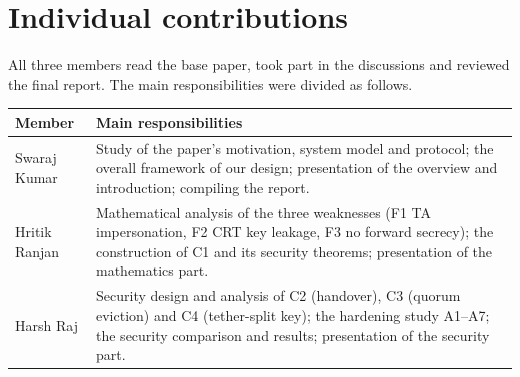 \chapter{Individual contributions}\label{ch:team}
All three members read the base paper, took part in the discussions and reviewed the final report. The main responsibilities were divided as follows.
\begin{center}
\begin{tabularx}{\linewidth}{@{}l X@{}}
\toprule
\textbf{Member} & \textbf{Main responsibilities}\\
\midrule
Swaraj Kumar & Study of the paper's motivation, system model and protocol; the overall framework of our design; presentation of the overview and
introduction; compiling the report.\\
Hritik Ranjan & Mathematical analysis of the three weaknesses (F1 TA impersonation, F2 CRT key leakage, F3 no forward secrecy); the construction of C1
and its security theorems; presentation of the mathematics part.\\
Harsh Raj & Security design and analysis of C2 (handover), C3 (quorum eviction) and C4 (tether-split key); the hardening study A1--A7; the security
comparison and results; presentation of the security part.\\
\bottomrule
\end{tabularx}
\end{center}
